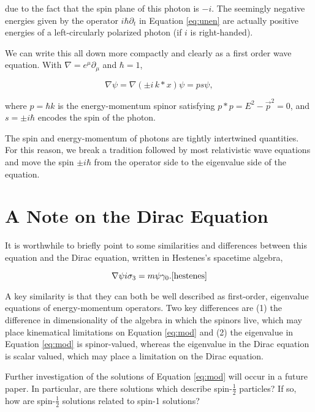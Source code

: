 \documentclass{birkjour}
\begin{document}
due to the fact that the spin plane of this photon is $-i$. The seemingly negative energies given by the operator $i \hbar \partial_t$ in Equation \ref{eq:unen} are actually positive energies of a left-circularly polarized photon (if $i$ is right-handed). 

We can write this all down more compactly and clearly as a first order wave equation. With $\nabla = e^\mu \partial_\mu$ and $\hbar = 1$,

\begin{equation}
  \nabla \psi = \nabla (\pm i \, k * x) \psi = p s \psi,\label{eq:mod}
\end{equation}

where $p = \hbar k$ is the energy-momentum spinor satisfying $p * p = E^2 - \vec p^2 = 0$, and $s = \pm i \hbar$ encodes the spin of the photon.

The spin and energy-momentum of photons are tightly intertwined quantities. For this reason, we break a tradition followed by most relativistic wave equations and move the spin $\pm i \hbar$ from the operator side to the eigenvalue side of the equation.

\section{A Note on the Dirac Equation}

It is worthwhile to briefly point to some similarities and differences between this equation and the Dirac equation, written in Hestenes's spacetime algebra,

\begin{equation}
  \nabla \psi i \sigma_3 = m \psi \gamma_0. \text{\cite{hestenes}}
\end{equation}

A key similarity is that they can both be well described as first-order, eigenvalue equations of energy-momentum operators. Two key differences are (1) the difference in dimensionality of the algebra in which the spinors live, which may place kinematical limitations on Equation \ref{eq:mod} and (2) the eigenvalue in Equation \ref{eq:mod} is spinor-valued, whereas the eigenvalue in the Dirac equation is scalar valued, which may place a limitation on the Dirac equation.

Further investigation of the solutions of Equation \ref{eq:mod} will occur in a future paper. In particular, are there solutions which describe spin-$\frac{1}{2}$ particles? If so, how are spin-$\frac{1}{2}$ solutions related to spin-1 solutions?
\end{document}
